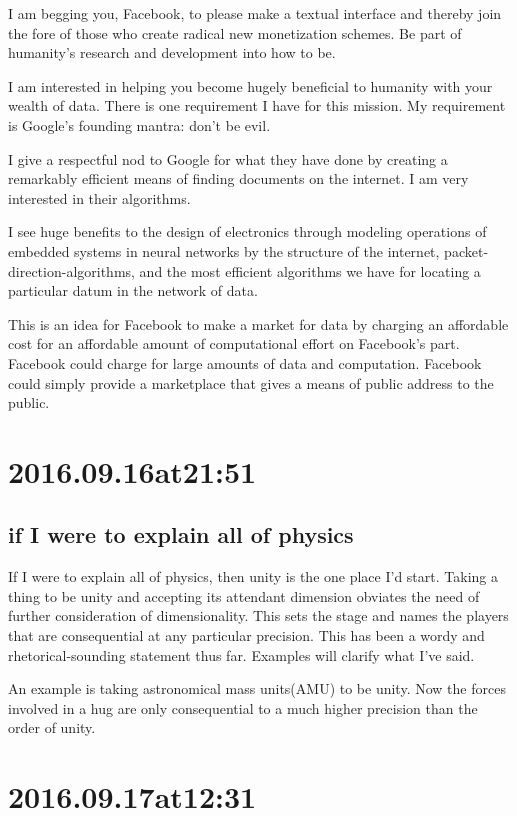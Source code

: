 I am begging you, Facebook, to please make a textual interface and thereby join the fore of those who create radical new monetization schemes. Be part of humanity's research and development into how to be.

I am interested in helping you become hugely beneficial to humanity with your wealth of data. There is one requirement I have for this mission. My requirement is Google's founding mantra: don't be evil.

I give a respectful nod to Google for what they have done by creating a remarkably efficient means of finding documents on the internet. I am very interested in their algorithms.

I see huge benefits to the design of electronics through modeling operations of embedded systems in neural networks by the structure of the internet, packet-direction-algorithms, and the most efficient algorithms we have for locating a particular datum in the network of data.

This is an idea for Facebook to make a market for data by charging an affordable cost for an affordable amount of computational effort on Facebook's part. Facebook could charge for large amounts of data and computation. Facebook could simply provide a marketplace that gives a means of public address to the public.


\section*{ 2016.09.16at21:51 }
\subsection*{ if I were to explain all of physics }
If I were to explain all of physics, then unity is the one place I'd start. Taking a thing to be unity and accepting its attendant dimension obviates the need of further consideration of dimensionality. This sets the stage and names the players that are consequential at any particular precision. This has been a wordy and rhetorical-sounding statement thus far. Examples will clarify what I've said.

An example is taking astronomical mass units(AMU) to be unity. Now the forces involved in a hug are only consequential to a much higher precision than the order of unity.

\section*{ 2016.09.17at12:31 }
